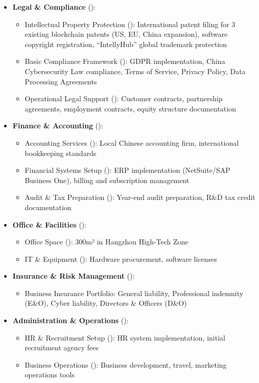 \begin{itemize}
    \item \textbf{Legal \& Compliance} ():
    \begin{itemize}
        \item Intellectual Property Protection (): International patent filing for 3 existing blockchain patents (US, EU, China expansion), software copyright registration, ``IntellyHub'' global trademark protection
        \item Basic Compliance Framework (): GDPR implementation, China Cybersecurity Law compliance, Terms of Service, Privacy Policy, Data Processing Agreements
        \item Operational Legal Support (): Customer contracts, partnership agreements, employment contracts, equity structure documentation
    \end{itemize}
    
    \item \textbf{Finance \& Accounting} ():
    \begin{itemize}
        \item Accounting Services (): Local Chinese accounting firm, international bookkeeping standards
        \item Financial Systems Setup (): ERP implementation (NetSuite/SAP Business One), billing and subscription management
        \item Audit \& Tax Preparation (): Year-end audit preparation, R\&D tax credit documentation
    \end{itemize}
    
    \item \textbf{Office \& Facilities} ():
    \begin{itemize}
        \item Office Space (): 300m² in Hangzhou High-Tech Zone
        \item IT \& Equipment (): Hardware procurement, software licenses
    \end{itemize}
    
    \item \textbf{Insurance \& Risk Management} ():
    \begin{itemize}
        \item Business Insurance Portfolio: General liability, Professional indemnity (E\&O), Cyber liability, Directors \& Officers (D\&O)
    \end{itemize}
    
    \item \textbf{Administration \& Operations} ():
    \begin{itemize}
        \item HR \& Recruitment Setup (): HR system implementation, initial recruitment agency fees
        \item Business Operations (): Business development, travel, marketing operations tools
    \end{itemize}
\end{itemize}

